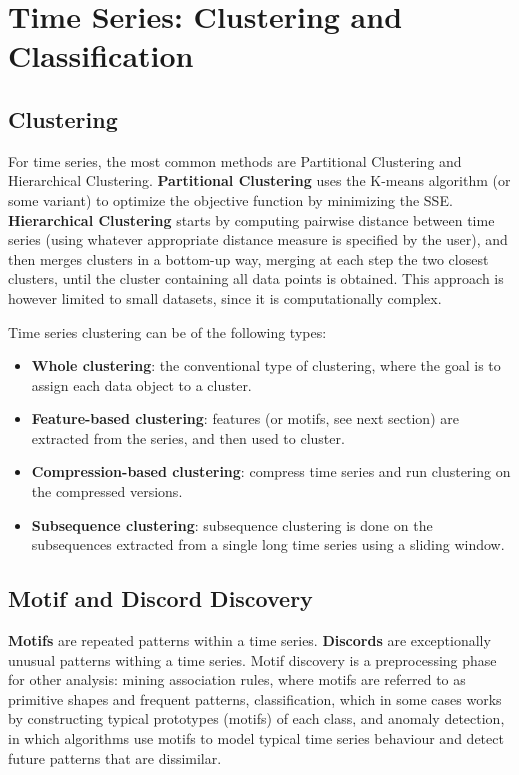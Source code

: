 \chapter{Time Series: Clustering and Classification}

\section{Clustering}

For time series, the most common methods are Partitional Clustering and Hierarchical Clustering. \textbf{Partitional Clustering} uses the K-means algorithm (or some variant) to optimize the objective function by minimizing the SSE. \textbf{Hierarchical Clustering} starts by computing pairwise distance between time series (using whatever appropriate distance measure is specified by the user), and then merges clusters in a bottom-up way, merging at each step the two closest clusters, until the cluster containing all data points is obtained. This approach is however limited to small datasets, since it is computationally complex.

Time series clustering can be of the following types:
\begin{itemize}
    \item \textbf{Whole clustering}: the conventional type of clustering, where the goal is to assign each data object to a cluster.

    \item \textbf{Feature-based clustering}: features (or motifs, see next section) are extracted from the series, and then used to cluster.

    \item \textbf{Compression-based clustering}: compress time series and run clustering on the compressed versions.

    \item \textbf{Subsequence clustering}: subsequence clustering is done on the subsequences extracted from a single long time series using a sliding window.
\end{itemize}

\section{Motif and Discord Discovery}

\textbf{Motifs} are repeated patterns within a time series. \textbf{Discords} are exceptionally unusual patterns withing a time series. Motif discovery is a preprocessing phase for other analysis: mining association rules, where motifs are referred to as primitive shapes and frequent patterns, classification, which in some cases works by constructing typical prototypes (motifs) of each class, and anomaly detection, in which algorithms use motifs to model typical time series behaviour and detect future patterns that are dissimilar.

